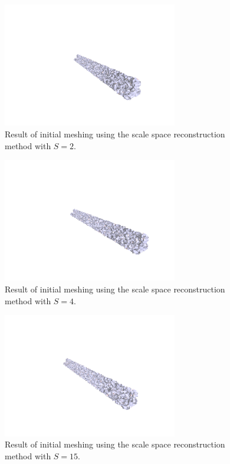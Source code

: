 \documentclass[12pt]{drexelthesis}
\begin{document}
\begin{figure}[!h] 
	\label{2cmnoise:scalepspace2}
	\centering
		\includegraphics[trim={5in 2in 1.5in 3in},clip,width=3in]{simulated-lab-scan/2cmnoise/2cmmesh/scalespace200.png}
		\caption[Initial meshing using a scale space reconstruction with $S = 2$]{\centering  Result of initial meshing using the scale space reconstruction method with $S = 2$.}
\end{figure}


\begin{figure}[!h]
	\label{2cmnoise:scalespace4}
	\centering
		\includegraphics[trim={4.5in 2in 1.5in 3in},clip,width=3in]{simulated-lab-scan/2cmnoise/2cmmesh/scalespace400.png}
		\caption[Initial meshing using a scale space reconstruction with $S = 4$]{\centering  Result of initial meshing using the scale space reconstruction method with $S = 4$.}
\end{figure}


\begin{figure}[!h]
	\label{2cmnoise:scalespace15}
	\centering
		\includegraphics[trim={4in 2in 1.5in 3in},clip,width=3in]{simulated-lab-scan/2cmnoise/2cmmesh/scalespace1500.png}
		\caption[Initial meshing using a scale space reconstruction with $S = 15$]{\centering  Result of initial meshing using the scale space reconstruction method with $S = 15$.}
\end{figure}
\end{document}
